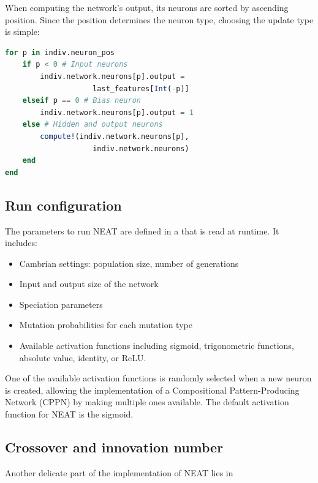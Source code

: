 When computing the network's output, its neurons are sorted by ascending position. Since the position determines the neuron type, choosing the update type is simple:

\begin{minipage}{\linewidth}
\begin{lstlisting}[language=Julia, caption=NEAT network processing (\href{https://github.com/TemplierPaul/NeuroEvolution.jl/blob/master/src/process.jl}{\color{blue}{Source}})]
for p in indiv.neuron_pos
    if p < 0 # Input neurons
        indiv.network.neurons[p].output = 
                    last_features[Int(-p)]
    elseif p == 0 # Bias neuron
        indiv.network.neurons[p].output = 1
    else # Hidden and output neurons
        compute!(indiv.network.neurons[p], 
                    indiv.network.neurons)
    end
end
\end{lstlisting}
\end{minipage}

\subsection{Run configuration}

The parameters to run NEAT are defined in a \href{https://github.com/TemplierPaul/NeuroEvolution.jl/blob/master/cfg/test.yaml}{\color{blue}{YAML file}}  that is read at runtime. It includes:

\begin{itemize}
    \item Cambrian settings: population size, number of generations
    \item Input and output size of the network
    \item Speciation parameters
    \item Mutation probabilities for each mutation type
    \item Available activation functions including sigmoid, trigonometric functions, absolute value, identity, or ReLU. 
\end{itemize}

One of the available activation functions is randomly selected when a new neuron is created, allowing the implementation of a Compositional Pattern-Producing Network (CPPN) by making multiple ones available. The default activation function for NEAT is the sigmoid. 

\subsection{Crossover and innovation number}
Another delicate part of the implementation of NEAT lies in 

